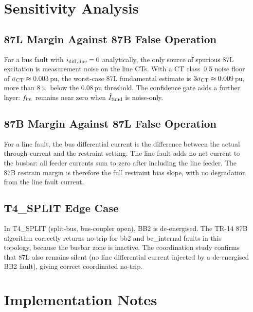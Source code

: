 \documentclass[11pt, a4paper]{article}
\begin{document}
\section{Sensitivity Analysis}
\label{sec:sensitivity}

\subsection{87L Margin Against 87B False Operation}

For a bus fault with $i_{\rm diff,line}=0$ analytically, the only source of
spurious 87L excitation is measurement noise on the line CTs.  With a CT
class~0.5 noise floor of $\sigma_{\rm CT}\approx0.003$\,pu, the worst-case
87L fundamental estimate is $3\sigma_{\rm CT}\approx0.009$\,pu, more than
$8\times$ below the 0.08\,pu threshold.  The confidence gate adds a further
layer: $f_{\rm int}$ remains near zero when $\hat{I}_{\rm fund}$ is noise-only.

\subsection{87B Margin Against 87L False Operation}

For a line fault, the bus differential current is the difference between the
actual through-current and the restraint setting.  The line fault adds no
net current to the busbar: all feeder currents sum to zero after including
the line feeder.  The 87B restrain margin is therefore the full restraint
bias slope, with no degradation from the line fault current.

\subsection{T4\_SPLIT Edge Case}

In T4\_SPLIT (split-bus, bus-coupler open), BB2 is de-energised.  The TR-14
87B algorithm correctly returns no-trip for bb2 and bc\_internal faults in
this topology, because the busbar zone is inactive.  The coordination study
confirms that 87L also remains silent (no line differential current injected
by a de-energised BB2 fault), giving correct coordinated no-trip.


\section{Implementation Notes}
\label{sec:impl}
\end{document}
